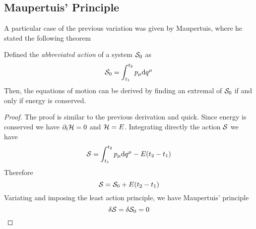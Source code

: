\documentclass[../admech.tex]{subfiles}
\begin{document}
\subsection{Maupertuis' Principle}
A particular case of the previous variation was given by Maupertuis, where he stated the following theorem
\begin{thm}
	Defined the \emph{abbreviated action} of a system $\mathcal{S}_0$ as
	\begin{equation*}
		\mathcal{S}_0=\int_{t_1}^{t_2}p_\mu\dd q^\mu
	\end{equation*}
	Then, the equations of motion can be derived by finding an extremal of $\mathcal{S}_0$ if and only if energy is conserved.
\end{thm}
\begin{proof}
	The proof is similar to the previous derivation and quick. Since energy is conserved we have $\partial_t\mathcal{H}=0$ and $\mathcal{H}=E$. Integrating directly the action $\mathcal{S}$ we have
	\begin{equation*}
		\mathcal{S}=\int_{t_1}^{t_2}p_\mu\dd q^\mu-E(t_2-t_1)
	\end{equation*}
	Therefore
	\begin{equation*}
		\mathcal{S}=\mathcal{S}_0+E(t_2-t_1)
	\end{equation*}
	Variating and imposing the least action principle, we have Maupertuis' principle
	\begin{equation*}
		\delta\mathcal{S}=\delta\mathcal{S}_0=0
	\end{equation*}
\end{proof}
\end{document}
